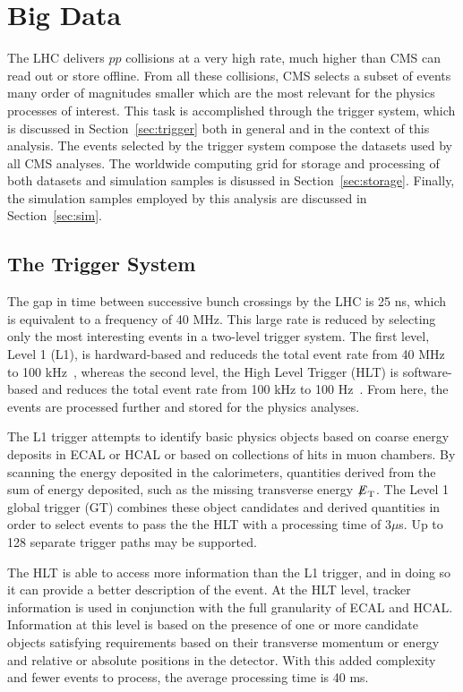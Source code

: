 \chapter{Big Data\label{ch:data}}

The LHC delivers $pp$ collisions at a very high rate, much higher than CMS can read out or store
offline. From all these collisions, CMS selects a subset of events many order of magnitudes smaller
which are the most relevant for the physics processes of interest. This task is accomplished
through the trigger system, which is discussed in Section~\ref{sec:trigger} both in general and
in the context of this analysis. The events selected by the trigger system compose the datasets
used by all CMS analyses. The worldwide computing grid for storage and processing of both datasets
and simulation samples is disussed in Section~\ref{sec:storage}. Finally, the simulation samples
employed by this analysis are discussed in Section~\ref{sec:sim}.


\section{The Trigger System\label{sec:trigger}}

The gap in time between successive bunch crossings by the LHC is 25 ns, which is equivalent to
a frequency of 40 MHz. This large rate is reduced by selecting only the most interesting events
in a two-level trigger system. The first level, Level 1 (L1), is hardward-based and reduceds the
total event rate from 40 MHz to 100 kHz~\cite{Bayatyan:706847}, whereas the second level,
the High Level Trigger (HLT) is software-based and reduces the total event rate from 100 kHz to
100 Hz~\cite{Virdee:1043242}. From here, the events are processed further and stored
for the physics analyses.

The L1 trigger attempts to identify basic physics objects based on coarse energy deposits in
ECAL or HCAL or
based on collections of hits in muon chambers. By scanning the energy deposited in the calorimeters,
quantities derived from the sum of energy deposited, such as the missing transverse energy ${\not\mathrel{E}}_{\text{T}}$.
The Level 1 global trigger (GT) combines these object candidates and derived quantities in order
to select events to pass the the HLT with a processing time of $3 \mu$s.
Up to 128 separate trigger paths may be supported.

The HLT is able to access more information than the L1 trigger, and in doing so it can provide
a better description of the event. At the HLT level, tracker information is used in conjunction with
the full granularity of ECAL and HCAL. Information at this level is based on the presence of one or
more candidate objects satisfying requirements based on their transverse momentum or energy and relative
or absolute positions in the detector. With this added complexity and fewer events to process,
the average processing time is 40 ms.


